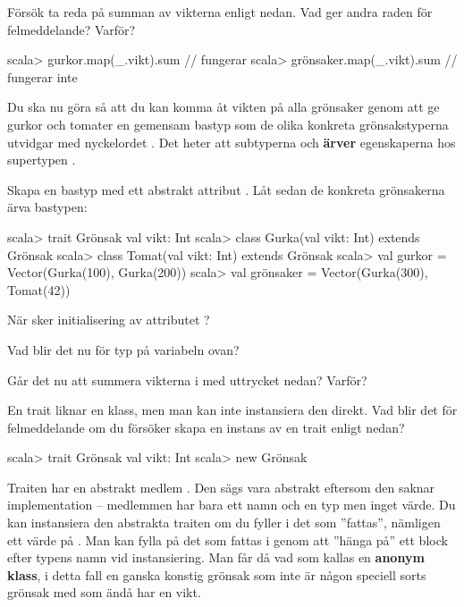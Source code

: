 \Subtask Försök ta reda på summan av vikterna enligt nedan. Vad ger andra raden för felmeddelande? Varför?

\begin{REPL}
scala> gurkor.map(_.vikt).sum     // fungerar
scala> grönsaker.map(_.vikt).sum  // fungerar inte
\end{REPL}

\Subtask Du ska nu göra så att du kan komma åt vikten på alla grönsaker genom att ge gurkor och tomater en gemensam bastyp som de olika konkreta grönsakstyperna utvidgar med nyckelordet . Det heter att subtyperna  och  \textbf{ärver} egenskaperna hos supertypen .

Skapa en bastyp  med ett abstrakt attribut . Låt sedan de konkreta grönsakerna ärva bastypen:

\begin{REPL}
scala> trait Grönsak { val vikt: Int }
scala> class Gurka(val vikt: Int) extends Grönsak
scala> class Tomat(val vikt: Int) extends Grönsak
scala> val gurkor = Vector(Gurka(100), Gurka(200))
scala> val grönsaker = Vector(Gurka(300), Tomat(42))
\end{REPL}
När sker initialisering av attributet ?

\Subtask Vad blir det nu för typ på variabeln  ovan?

\Subtask Går det nu att summera vikterna i  med uttrycket nedan? Varför?\\ 


\Subtask En trait liknar en klass, men man kan inte instansiera den direkt. Vad blir det för felmeddelande om du försöker skapa en instans av en trait enligt nedan?
\begin{REPL}
scala> trait Grönsak { val vikt: Int }
scala> new Grönsak
\end{REPL}


\Subtask Traiten  har en abstrakt medlem . Den sägs vara abstrakt eftersom den saknar implementation -- medlemmen har bara ett namn och en typ men inget värde. Du kan instansiera den abstrakta traiten  om du fyller i det som ''fattas'', nämligen ett värde på . Man kan fylla på det som fattas i genom att ''hänga på'' ett block efter typens namn vid instansiering. Man får då vad som kallas en \textbf{anonym klass}, i detta fall en ganska konstig grönsak som inte är någon speciell sorts grönsak med som ändå har en vikt.

